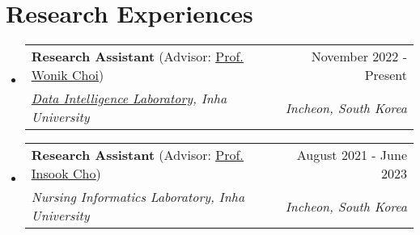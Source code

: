 \documentclass[letterpaper,11pt]{article}
\makeatletter
\newcommand{\resumeSubheading}[4]{
  \vspace{-1pt}\item
    \begin{tabular*}{0.97\textwidth}{l@{\extracolsep{\fill}}r}
      #1 & #2 \\
      \textit{\small#3} & \textit{\small #4} \\
    \end{tabular*}\vspace{-5pt}
}
\makeatother
\begin{document}
    \section{Research Experiences}
    \begin{itemize}[leftmargin=*,label=]
        \resumeSubheading
        {\textbf{Research Assistant} (Advisor: \underline{\href{http://bit.ly/3zSrQ8F}{Prof. Wonik Choi}})}{November 2022 - Present}
            {\href{http://dilab.inha.ac.kr/}{Data Intelligence Laboratory}, Inha University}{Incheon, South Korea}
        \resumeSubheading
        {\textbf{Research Assistant} (Advisor: \underline{\href{http://bit.ly/412nYOw}{Prof. Insook Cho}})}{August 2021 - June 2023}
            {Nursing Informatics Laboratory, Inha University}{Incheon, South Korea}
    \end{itemize}
    
\end{document}

